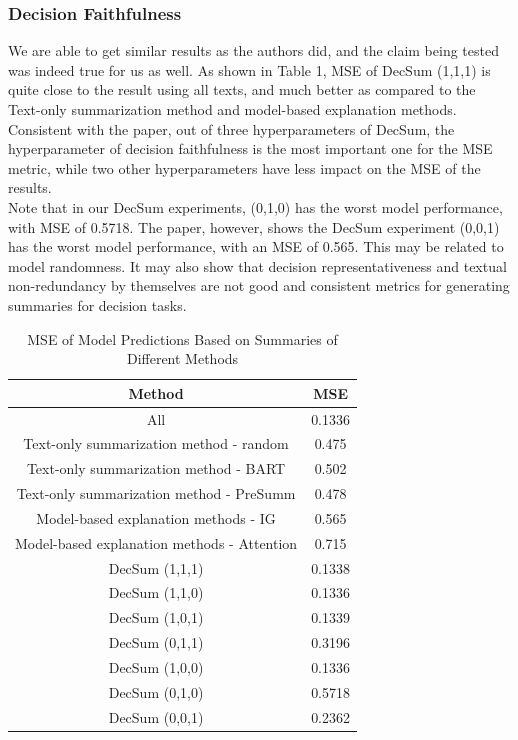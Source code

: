 \documentclass{article}
\begin{document}
\subsubsection{Decision Faithfulness}
We are able to get similar results as the authors did, and the claim being tested was indeed true for us as well.
As shown in Table 1, MSE of DecSum (1,1,1) is quite close to the result using all texts, and much better as compared to the Text-only summarization
method and model-based explanation methods. Consistent with the paper, out of three hyperparameters of DecSum, the hyperparameter of decision faithfulness is the most important one for the MSE metric,
while two other hyperparameters have less impact on the MSE of the results. \\

Note that in our DecSum experiments, (0,1,0) has the worst model performance, with MSE of 0.5718. The paper, however, shows the DecSum experiment (0,0,1) has the worst model performance,
with an MSE of 0.565. This may be related to model randomness. It may also show that decision representativeness and textual non-redundancy by themselves are not good and consistent metrics for
generating summaries for decision tasks.

\begin{table}[ht]
    \centering
    \caption{MSE of Model Predictions Based on Summaries of Different Methods}
    \begin{tabular}{|c|c|}
        \hline \textbf{Method} & \textbf{MSE} \\
        \hline All & 0.1336 \\
        \hline Text-only summarization method - random & 0.475 \\
        \hline Text-only summarization method - BART & 0.502 \\
        \hline Text-only summarization method - PreSumm & 0.478 \\
        \hline Model-based explanation methods - IG & 0.565 \\
        \hline Model-based explanation methods - Attention & 0.715 \\
        \hline DecSum (1,1,1)   & 0.1338 \\
        \hline DecSum (1,1,0)   & 0.1336 \\
        \hline DecSum (1,0,1)   & 0.1339 \\
        \hline DecSum (0,1,1)   & 0.3196 \\
        \hline DecSum (1,0,0)   & 0.1336 \\
        \hline DecSum (0,1,0)   & 0.5718 \\
        \hline DecSum (0,0,1)   & 0.2362 \\ \hline
    \end{tabular}
\end{table}
\end{document}
